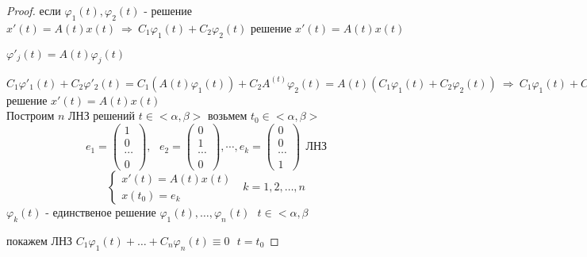 \begin{proof}
  если $\varphi_1(t), \varphi_2(t)$ - решение $x'(t) = A(t)x(t) ~ \Rightarrow ~
  C_1\varphi_1(t) + C_2\varphi_2(t)$ решение $x'(t) = A(t)x(t)$

  $\varphi'_j(t) = A(t)\varphi_j(t)$

  $C_1 \varphi'_1(t) + C_2 \varphi'_2(t) = C_1(A(t) \varphi_1(t)) +
  C_2A^{(t)}\varphi_2(t) = A(t)(C_1\varphi_1(t) + C_2\varphi_2(t)) ~
  \Rightarrow ~ C_1 \varphi_1(t) + C_2 \varphi_2(t)$ решение
  $x'(t) = A(t)x(t)$\\

  Построим $n$ ЛНЗ решений $t \in <\alpha, \beta>$ возьмем $t_0 \in
  <\alpha, \beta>$
  $$
  e_1 =
  \left(
  \begin{array}{c}
    1 \\
    0 \\
    \cdots \\
    0
  \end{array}
  \right), ~~~
  e_2 =
  \left(
  \begin{array}{c}
    0 \\
    1 \\
    \cdots \\
    0
  \end{array}
  \right), \cdots,
  e_k =
  \left(
  \begin{array}{c}
    0 \\
    0 \\
    \cdots \\
    1
  \end{array}
  \right) ~~ \text{ЛНЗ}
  $$
  $$
  \left\{
  \begin{array}{c}
    x'(t) = A(t)x(t) \\
    x(t_0) = e_k
  \end{array}
  \right. ~~~ k = 1, 2, \ldots, n
  $$
  $\varphi_k(t)$ - единственое решение $\varphi_1(t), \ldots, \varphi_n(t) ~~~
  t \in <\alpha, \beta$

  покажем ЛНЗ $C_1 \varphi_1(t) + \ldots + C_n \varphi_n(t) \equiv 0 ~~~
  t = t_0$


\end{proof}
